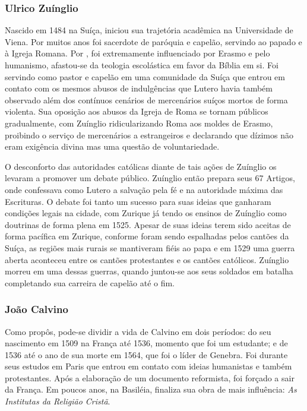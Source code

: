 \documentclass[
    article,            %
	12pt,				%
	oneside,			%
	a4paper,			%
	chapter=TITLE,		%
	section=TITLE,		%
	english,			%
	french,				%
	spanish,			%
	brazil				%
	]{abntex2}
\begin{document}
\subsubsection{Ulrico Zuínglio}
Nascido em 1484 na Suíça, iniciou sua trajetória acadêmica na Universidade de Viena. Por muitos anos foi sacerdote de paróquia e capelão, servindo ao papado e à Igreja Romana. Por , foi extremamente influenciado por Erasmo e pelo humanismo, afastou-se da teologia escolástica em favor da Bíblia em si. Foi servindo como pastor e capelão em uma comunidade da Suíça que entrou em contato com os mesmos abusos de indulgências que Lutero havia também observado além dos contínuos cenários de mercenários suíços mortos de forma violenta. Sua oposição aos abusos da Igreja de Roma se tornam públicos gradualmente, com Zuínglio ridicularizando Roma aos moldes de Erasmo, proibindo o serviço de mercenários a estrangeiros e declarando que dízimos não eram exigência divina mas uma questão de voluntariedade.

O desconforto das autoridades católicas diante de tais ações de Zuínglio os levaram a promover um debate público. Zuínglio então prepara seus 67 Artigos, onde confessava como Lutero a salvação pela fé e na autoridade máxima das Escrituras. O debate foi tanto um sucesso para suas ideias que ganharam condições legais na cidade, com Zurique já tendo os ensinos de Zuínglio como doutrinas de forma plena em 1525. Apesar de suas ideias terem sido aceitas de forma pacífica em Zurique, conforme foram sendo espalhadas pelos cantões da Suíça, as regiões mais rurais se mantiveram fiéis ao papa e em 1529 uma guerra aberta aconteceu entre os cantões protestantes e os cantões católicos. Zuínglio morreu em uma dessas guerras, quando juntou-se aos seus soldados em batalha completando sua carreira de capelão até o fim.

\subsubsection{João Calvino}
Como  propôs, pode-se dividir a vida de Calvino em dois períodos: do seu nascimento em 1509 na França até 1536, momento que foi um estudante; e de 1536 até o ano de sua morte em 1564, que foi o líder de Genebra. Foi durante seus estudos em Paris que entrou em contato com ideias humanistas e também protestantes. Após a elaboração de um documento reformista, foi forçado a sair da França. Em poucos anos, na Basiléia, finaliza sua obra de mais influência: \emph{As Institutas da Religião Cristã}.
\end{document}
